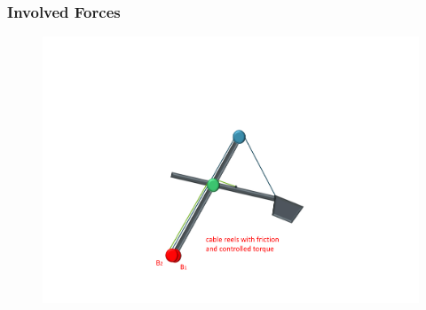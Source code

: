 

\begin{frame}
	\frametitle{Involved Forces}
	\begin{figure}[bth]
	  \begin{center}
	    \includegraphics[trim=22cm 5cm 2cm 24cm, clip=true, 
	    width=\linewidth]{img/Excavator_Only1}
	  \end{center}
	\end{figure}

\end{frame}

